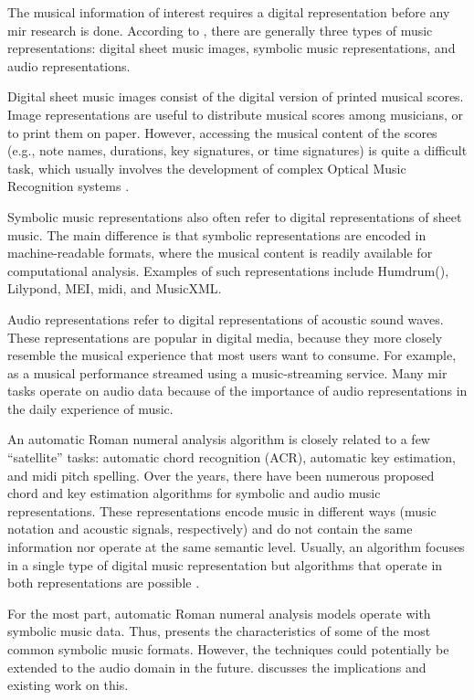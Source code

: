 


The musical information of interest requires a digital
representation before any \gls{mir} research is done.
According to \textcite{muller2015music}, there are generally
three types of music representations: digital sheet music
images, symbolic music representations, and audio
representations.

Digital sheet music images consist of the digital version of
printed musical scores. Image representations are useful to
distribute musical scores among musicians, or to print them
on paper. However, accessing the musical content of the
scores (e.g., note names, durations, key signatures, or time
signatures) is quite a difficult task, which usually
involves the development of complex Optical Music
Recognition systems
\parencite{calvozaragoza2020understanding}.

Symbolic music representations also often refer to digital
representations of sheet music. The main difference is that
symbolic representations are encoded in machine-readable
formats, where the musical content is readily available for
computational analysis. Examples of such representations
include Humdrum(), Lilypond, MEI, \gls{midi}, and
MusicXML.

Audio representations refer to digital representations of
acoustic sound waves. These representations are popular in
digital media, because they more closely resemble the
musical experience that most users want to consume. For
example, as a musical performance streamed using a
music-streaming service. Many \gls{mir} tasks operate on
audio data because of the importance of audio
representations in the daily experience of music.

An automatic Roman numeral analysis algorithm is closely
related to a few ``satellite'' tasks: automatic chord
recognition (ACR), automatic key estimation, and \gls{midi} pitch
spelling. Over the years, there have been numerous proposed
chord and key estimation algorithms for symbolic and audio
music representations. These representations encode music in
different ways (music notation and acoustic signals,
respectively) and do not contain the same information nor
operate at the same semantic level. Usually, an algorithm
focuses in a single type of digital music representation but
algorithms that operate in both representations are possible
\parencite{napoleslopez2019keyfinding}.

For the most part, automatic Roman numeral analysis models
operate with symbolic music data. Thus,
 presents the
characteristics of some of the most common symbolic music
formats. However, the techniques could potentially be
extended to the audio domain in the future.
 discusses the
implications and existing work on this.

